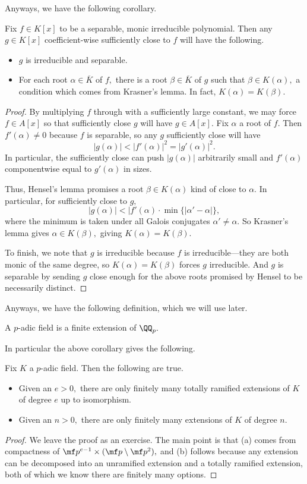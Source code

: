 \documentclass[../notes.tex]{subfiles}
\begin{document}
Anyways, we have the following corollary.
\begin{corollary}[Krasner]
	Fix $f\in K[x]$ to be a separable, monic irreducible polynomial. Then any $g\in K[x]$ coefficient-wise sufficiently close to $f$ will have the following.
	\begin{itemize}
		\item $g$ is irreducible and separable.
		\item For each root $\alpha\in\overline K$ of $f,$ there is a root $\beta\in\overline K$ of $g$ such that $\beta\in K(\alpha),$ a condition which comes from Krasner's lemma. In fact, $K(\alpha)=K(\beta).$
	\end{itemize}
\end{corollary}
\begin{proof}
	By multiplying $f$ through with a sufficiently large constant, we may force $f\in A[x]$ so that sufficiently close $g$ will have $g\in A[x].$ Fix $\alpha$ a root of $f.$ Then $f'(\alpha)\ne0$ because $f$ is separable, so any $g$ sufficiently close will have
	\[|g(\alpha)|<|f'(\alpha)|^2=|g'(\alpha)|^2.\]
	In particular, the sufficiently close can push $|g(\alpha)|$ arbitrarily small and $f'(\alpha)$ componentwise equal to $g'(\alpha)$ in sizes.

	Thus, Hensel's lemma promises a root $\beta\in K(\alpha)$ kind of close to $\alpha.$ In particular, for sufficiently close to $g,$
	\[|g(\alpha)|<|f'(\alpha)\cdot\min\{|\alpha'-\alpha|\},\]
	where the minimum is taken under all Galois conjugates $\alpha'\ne\alpha.$ So Krasner's lemma gives $\alpha\in K(\beta),$ giving $K(\alpha)=K(\beta).$

	To finish, we note that $g$ is irreducible because $f$ is irreducible---they are both monic of the same degree, so $K(\alpha)=K(\beta)$ forces $g$ irreducible. And $g$ is separable by sending $g$ close enough for the above roots promised by Hensel to be necessarily distinct.
\end{proof}
Anyways, we have the following definition, which we will use later.
\begin{definition}
	A $p$-adic field is a finite extension of $\QQ_p.$
\end{definition}
In particular the above corollary gives the following.
\begin{corollary}
	Fix $K$ a $p$-adic field. Then the following are true.
	\begin{itemize}
		\item Given an $e>0,$ there are only finitely many totally ramified extensions of $K$ of degree $e$ up to isomorphism.
		\item Given an $n>0,$ there are only finitely many extensions of $K$ of degree $n.$
	\end{itemize}
\end{corollary}
\begin{proof}
	We leave the proof as an exercise. The main point is that (a) comes from compactness of $\mf p^{e-1}\times(\mf p\setminus\mf p^2),$ and (b) follows because any extension can be decomposed into an unramified extension and a totally ramified extension, both of which we know there are finitely many options.
\end{proof}
\end{document}
